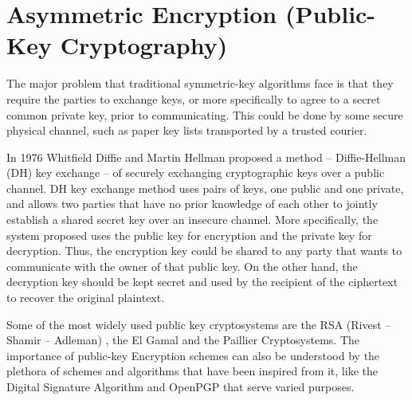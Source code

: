 \section{Asymmetric Encryption (Public-Key Cryptography)}\label{s:public-key-encryption}
The major problem that traditional symmetric-key algorithms face is that they require the parties to exchange keys, or more specifically to agree to a secret common private key, prior to communicating.
This could be done by some secure physical channel, such as paper key lists transported by a trusted courier.

In 1976 Whitfield Diffie and Martin Hellman proposed a method – Diffie-Hellman (DH) key exchange \cite{diffie1976new} – of securely exchanging cryptographic keys over a public channel.
DH key exchange method uses pairs of keys, one public and one private, and allows two parties that have no prior knowledge of each other to jointly establish a shared secret key over an insecure channel.
More specifically, the system proposed uses the public key for encryption and the private key for decryption.
Thus, the encryption key could be shared to any party that wants to communicate with the owner of that public key.
On the other hand, the decryption key should be kept secret and used by the recipient of the ciphertext to recover the original plaintext.



Some of the most widely used public key cryptosystems are the RSA (Rivest -- Shamir -- Adleman) \cite{rivest1978method}, the El Gamal \cite{elgamal1985public} and the Paillier \cite{paillier1999public} Cryptosystems.
The importance of public-key Encryption schemes can also be understood by the plethora of schemes and algorithms that have been inspired from it, like the Digital Signature Algorithm and OpenPGP that serve varied purposes.
